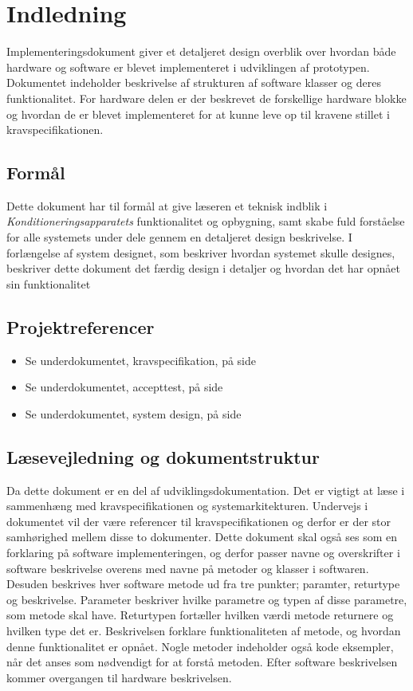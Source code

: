 	\chapter{Indledning}
	Implementeringsdokument giver et detaljeret design overblik over hvordan både hardware og software er blevet implementeret i udviklingen af prototypen. Dokumentet indeholder beskrivelse af strukturen af software klasser og deres funktionalitet. For hardware delen er der beskrevet de forskellige hardware blokke og hvordan de er blevet implementeret for at kunne leve op til kravene stillet i kravspecifikationen. 
	
	\section{Formål}
	Dette dokument har til formål at give læseren et teknisk indblik i \textit{Konditioneringsapparatets} funktionalitet og opbygning, samt skabe fuld forståelse for alle systemets under dele gennem en detaljeret design beskrivelse. I forlængelse af system designet, som beskriver hvordan systemet skulle designes, beskriver dette dokument det færdig design i detaljer og hvordan det har opnået sin funktionalitet
	
	\section{Projektreferencer}
	\begin{itemize}
		\item Se underdokumentet, kravspecifikation, på side \pageref{part:ks}
		\item Se underdokumentet, accepttest, på side \pageref{part:at}
		\item Se underdokumentet, system design, på side \pageref{part:sd}
	\end{itemize}
	
	\section{Læsevejledning og dokumentstruktur}
	Da dette dokument er en del af udviklingsdokumentation. Det er vigtigt at læse i sammenhæng med kravspecifikationen og systemarkitekturen. Undervejs i dokumentet vil der være referencer til kravspecifikationen og derfor er der stor samhørighed mellem disse to dokumenter. Dette dokument skal også ses som en forklaring på software implementeringen, og derfor passer navne og overskrifter i software beskrivelse overens med navne på metoder og klasser i softwaren. Desuden beskrives hver software metode ud fra tre punkter; paramter, returtype og beskrivelse. Parameter beskriver hvilke parametre og typen af disse parametre, som metode skal have. Returtypen fortæller hvilken værdi metode returnere og hvilken type det er. Beskrivelsen forklare funktionaliteten af metode, og hvordan denne funktionalitet er opnået. Nogle metoder indeholder også kode eksempler, når det anses som nødvendigt for at forstå metoden. Efter software beskrivelsen kommer overgangen til hardware beskrivelsen.
	
